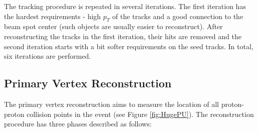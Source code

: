 The tracking procedure is repeated in several iterations.
The first iteration has the hardest requirements - high $p_{T}$ of the tracks
and a good connection to the beam spot center (such objects are usually easier to reconstruct). After reconstructing the tracks in the first iteration,
their hits are removed and the second iteration starts with a bit softer requirements on the seed tracks. In total, six iterations are performed.
% 

\subsection{Primary Vertex Reconstruction}\label{ssec:vtxReco}

The primary vertex reconstruction aims to measure the location of all proton-proton collision points in the event (see Figure \ref{fig:HugePU}). The reconstruction procedure has three
phases described as follows\cite{Chatrchyan:2014fea}:

